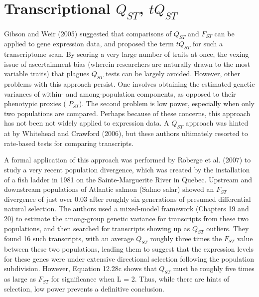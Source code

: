 \documentclass{article}
\begin{document}
\section{Transcriptional  $ Q_{ST} $,  $ tQ_{ST} $}
Gibson and Weir (2005) suggested that comparisons of  $ Q_{ST} $ and  $ F_{ST} $ can be applied to gene expression data, and proposed the term  $ tQ_{ST} $ for such a transcriptome scan. By scoring a very large number of traits at once, the vexing issue of ascertainment bias (wherein researchers are naturally drawn to the most variable traits) that plagues  $ Q_{ST} $ tests can be largely avoided. However, other problems with this approach persist. One involves obtaining the estimated genetic variances of within- and among-population components, as opposed to their phenotypic proxies ( $ P_{ST} $). The second problem is low power, especially when only two populations are compared. Perhaps because of these concerns, this approach has not been not widely applied to expression data. A  $ Q_{ST} $ approach was hinted at by Whitehead and Crawford (2006), but these authors ultimately resorted to rate-based tests for comparing transcripts.

A formal application of this approach was performed by Roberge et al. (2007) to study a very recent population divergence, which was created by the installation of a fish ladder in 1981 on the Sainte-Marguerite River in Quebec. Upstream and downstream populations of Atlantic salmon (Salmo salar) showed an  $ F_{ST} $ divergence of just over 0.03 after roughly six generations of presumed differential natural selection. The authors used a mixed-model framework (Chapters 19 and 20) to estimate the among-group genetic variance for transcripts from these two populations, and then searched for transcripts showing up as  $ Q_{ST} $ outliers. They found 16 such transcripts, with an average  $ Q_{ST} $ roughly three times the  $ F_{ST} $ value between these two populations, leading them to suggest that the expression levels for these genes were under extensive directional selection following the population subdivision. However, Equation 12.28c shows that  $ Q_{ST} $ must be roughly five times as large as  $ F_{ST} $ for significance when L = 2. Thus, while there are hints of selection, low power prevents a definitive conclusion.
\end{document}
